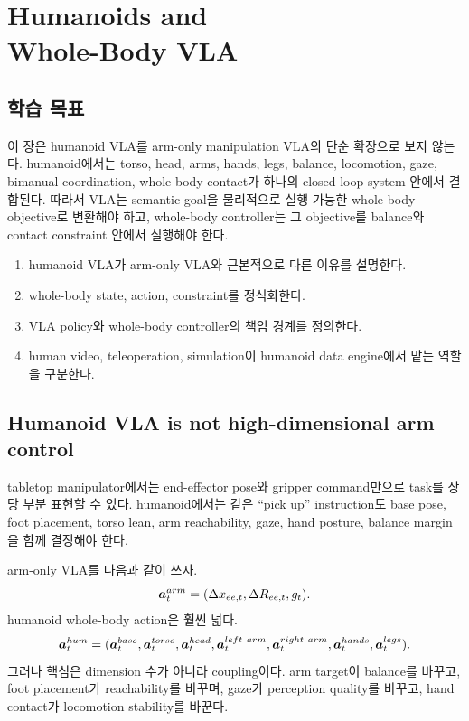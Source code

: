 \chapter[Humanoids and Whole-Body VLA]{Humanoids and\\Whole-Body VLA}

\section*{학습 목표}

이 장은 humanoid VLA를 arm-only manipulation VLA의 단순 확장으로 보지 않는다. humanoid에서는 torso, head, arms, hands, legs, balance, locomotion, gaze, bimanual coordination, whole-body contact가 하나의 closed-loop system 안에서 결합된다. 따라서 VLA는 semantic goal을 물리적으로 실행 가능한 whole-body objective로 변환해야 하고, whole-body controller는 그 objective를 balance와 contact constraint 안에서 실행해야 한다.

\begin{enumerate}
  \item humanoid VLA가 arm-only VLA와 근본적으로 다른 이유를 설명한다.
  \item whole-body state, action, constraint를 정식화한다.
  \item VLA policy와 whole-body controller의 책임 경계를 정의한다.
  \item human video, teleoperation, simulation이 humanoid data engine에서 맡는 역할을 구분한다.
\end{enumerate}

\section{Humanoid VLA is not high-dimensional arm control}

tabletop manipulator에서는 end-effector pose와 gripper command만으로 task를 상당 부분 표현할 수 있다. humanoid에서는 같은 ``pick up'' instruction도 base pose, foot placement, torso lean, arm reachability, gaze, hand posture, balance margin을 함께 결정해야 한다.

arm-only VLA를 다음과 같이 쓰자.
\begin{equation}
  \bm{a}_t^{arm}
  =
  (
  \Delta x_{ee,t},
  \Delta R_{ee,t},
  g_t
  ).
  \label{eq:ch20-arm-action}
\end{equation}
humanoid whole-body action은 훨씬 넓다.
\begin{equation}
  \bm{a}_t^{hum}
  =
  (
  \bm{a}_t^{base},
  \bm{a}_t^{torso},
  \bm{a}_t^{head},
  \bm{a}_t^{left\ arm},
  \bm{a}_t^{right\ arm},
  \bm{a}_t^{hands},
  \bm{a}_t^{legs}
  ).
  \label{eq:ch20-humanoid-action}
\end{equation}
그러나 핵심은 dimension 수가 아니라 coupling이다. arm target이 balance를 바꾸고, foot placement가 reachability를 바꾸며, gaze가 perception quality를 바꾸고, hand contact가 locomotion stability를 바꾼다.

